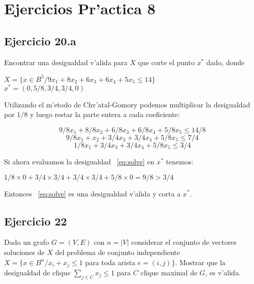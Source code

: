 \section{Ejercicios Pr'actica 8}
\subsection{Ejercicio 20.a}
Encontrar una desigualdad v'alida para $X$ que corte el punto $x^{*}$ dado, donde
\begin{center}
$X = \{x \in B^{5} / 9x_1 + 8x_2 + 6x_3 + 6x_4 + 5x_5 \leq 14\}$ \\
$x^{*} = (0, 5/8, 3/4, 3/4, 0)$
\end{center}
Utilizando el m'etodo de Chv'atal-Gomory podemos multiplicar la desigualdad por $1/8$ y luego restar la parte entera a cada coeficiente:
\begin{center}
\begin{equation}
9/8 x_1 + 8/8 x_2 + 6/8 x_3 + 6/8 x_4 + 5/8 x_5 \leq 14/8
\end{equation}
\begin{equation}
9/8 x_1 + x_2 + 3/4 x_3 + 3/4 x_4 + 5/8 x_5 \leq 7/4
\end{equation}
\begin{equation} \label{eq:solve}
1/8 x_1 + 3/4 x_3 + 3/4 x_4 + 5/8 x_5 \leq 3/4
\end{equation}
\end{center}
Si ahora evaluamos la desigualdad ~\ref{eq:solve} en $x^{*}$ tenemos:
\begin{center}
$1/8\times 0 + 3/4\times 3/4 + 3/4\times 3/4 + 5/8\times 0 = 9/8 > 3/4$
\end{center}
Entonces ~\ref{eq:solve} es una desigualdad v'alida y corta a $x^{*}$.

\subsection{Ejercicio 22}
Dado un grafo $G = (V, E)$ con $n = |V|$ considerar el conjunto de vectores soluciones de $X$ del
problema de conjunto independiente $X = \{ x\in B^{n}/ x_{i}+x_{j}\leq 1$ para toda arista $e =(i,j) \}$. Mostrar que la desigualdad de clique $\sum_{j\in C} x_{j} \leq 1$ para $C$ clique maximal de $G$, es v'alida. 
 